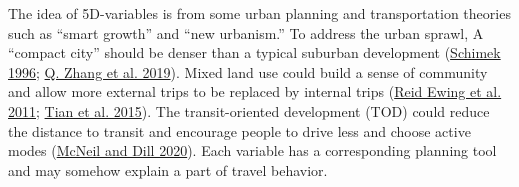 \documentclass[
  12pt,
]{article}
\begin{document}
The idea of 5D-variables is from some urban planning and transportation theories such as ``smart growth'' and ``new urbanism.'' To address the urban sprawl, A ``compact city'' should be denser than a typical suburban development (\protect\hyperlink{ref-schimekHouseholdMotorVehicle1996}{Schimek 1996}; \protect\hyperlink{ref-zhangHouseholdTripGeneration2019}{Q. Zhang et al. 2019}). Mixed land use could build a sense of community and allow more external trips to be replaced by internal trips (\protect\hyperlink{ref-ewingTrafficGeneratedMixedUse2011}{Reid Ewing et al. 2011}; \protect\hyperlink{ref-tianTrafficGeneratedMixedUse2015}{Tian et al. 2015}). The transit-oriented development (TOD) could reduce the distance to transit and encourage people to drive less and choose active modes (\protect\hyperlink{ref-mcneilRevisitingTODsHow2020}{McNeil and Dill 2020}). Each variable has a corresponding planning tool and may somehow explain a part of travel behavior.
\end{document}
